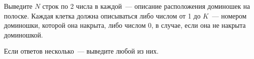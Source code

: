 Выведите $N$ строк по 2 числа в каждой~--- описание расположения доминошек на полоске. Каждая клетка должна описываться либо числом от 1 до $K$~--- номером доминошки, которой она накрыта, либо числом 0, в случае, если она не накрыта доминошкой.

Если ответов несколько~--- выведите любой из них.
